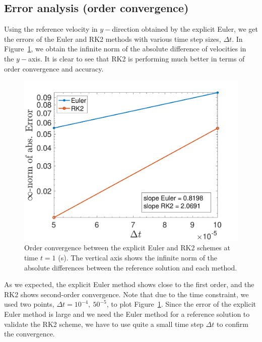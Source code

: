 \subsection{Error analysis (order convergence)}
Using the reference velocity in $y-$direction obtained by the explicit Euler, we get the errors of the Euler and RK2 methods with various time step sizes, $\Delta t$. 
In Figure~\ref{fig_second_order_compare_err_time}, we obtain the infinite norm of the absolute difference of velocities in the $y-$axis. 
It is clear to see that RK2 is performing much better in terms of order convergence and accuracy. 
\begin{figure}[h]
  \begin{center}
    \includegraphics[scale=0.4]{figures/fig_granular_box212_8cube_infnorm}
    \end{center}
  \caption{Order convergence between the explicit Euler and RK2 schemes at time $t = 1$ (s). The vertical axis shows the infinite norm of the absolute differences between the reference solution and each method.}
  \label{fig_second_order_compare_err_time}
\end{figure}
\par
As we expected, the explicit Euler method shows close to the first order, and the RK2 shows second-order convergence. Note that due to the time constraint, we used two points, $\Delta t = 10^{-4}, \ 50^{-5}$, to plot Figure~\ref{fig_second_order_compare_err_time}. Since the error of the explicit Euler method is large and we need the Euler method for a reference solution to validate the RK2 scheme, we have to use quite a small time step $\Delta t$ to confirm the convergence. 
